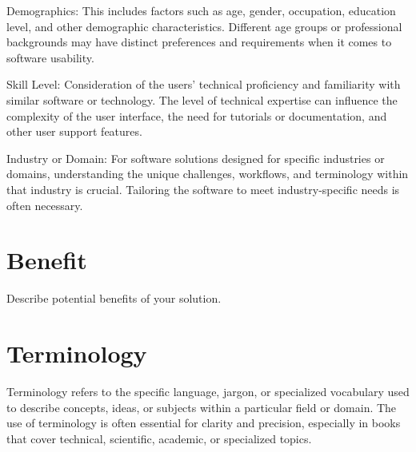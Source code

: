 Demographics: This includes factors such as age, gender,
occupation, education level, and other demographic characteristics. Different
age groups or professional backgrounds may have distinct preferences and
requirements when it comes to software usability.

Skill Level: Consideration of the users' technical proficiency and
familiarity with similar software or technology. The level of technical expertise
can influence the complexity of the user interface, the need for tutorials or
documentation, and other user support features.

Industry or Domain: For software solutions designed for specific
industries or domains, understanding the unique challenges, workflows, and
terminology within that industry is crucial. Tailoring the software to meet
industry-specific needs is often necessary.

\section{Benefit}
\label{section:benefit}

Describe potential benefits of your solution.

\section{Terminology}
\label{section:terminology}

Terminology refers to the specific language, jargon, or
specialized vocabulary used to describe concepts, ideas, or subjects within a
particular field or domain. The use of terminology is often essential for clarity
and precision, especially in books that cover technical, scientific, academic, or
specialized topics.